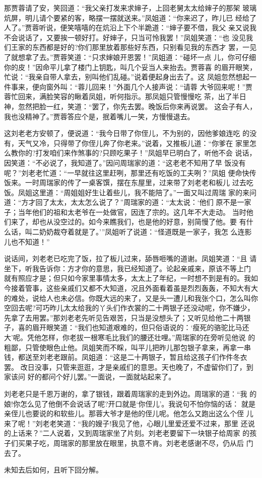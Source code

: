 那贾蓉请了安，笑回道：“我父亲打发来求婶子，上回老舅太太给婶子的那架
玻璃炕屏，明儿请个要紧的客，略摆一摆就送来。”凤姐道：“你来迟了，昨儿已
经给了人了。”贾蓉听说，便笑嘻嘻的在炕沿上下个半跪道：“婶子要不借，我父
亲又说我不会说话了，又要挨一顿好打。好婶子，只当可怜我罢！”凤姐笑道：“也
没见我们王家的东西都是好的?你们那里放着那些好东西，只别看见我的东西才
罢，一见了就想拿了去。”贾蓉笑道：“只求婶娘开恩罢！”凤姐道：“碰坏一点
儿，你可仔细你的皮！”因命平儿拿了楼门上钥匙，叫几个妥当人来抬去。贾蓉喜
的眉开眼笑，忙说：“我亲自带人拿去，别叫他们乱碰。”说着便起身出去了。这
凤姐忽然想起一件事来，便向窗外叫：“蓉儿回来！”外面几个人接声说：“请蓉
大爷回来呢！”贾蓉忙回来，满脸笑容的瞅着凤姐，听何指示。那凤姐只管慢慢吃
茶，出了半日神，忽然把脸一红，笑道：“罢了，你先去罢。晚饭后你来再说罢。
这会子有人，我也没精神了。”贾蓉答应个是，抿着嘴儿一笑，方慢慢退去。

这刘老老方安顿了，便说道：“我今日带了你侄儿，不为别的，因他爹娘连吃
的没有，天气又冷，只得带了你侄儿奔了你老来。”说着，又推板儿道：“你爹在
家里怎么教你的?打发咱们来作煞事的?只顾吃果子！”凤姐早已明白了，听他不会
说话，因笑道：“不必说了，我知道了。”因问周瑞家的道：“这老老不知用了早
饭没有呢？”刘老老忙道：“一早就往这里赶咧，那里还有吃饭的工夫咧？”凤姐
便命快传饭来。一时周瑞家的传了一桌客馔，摆在东屋里，过来带了刘老老和板儿
过去吃饭。凤姐这里道：“周姐姐好生让着些儿，我不能陪了。”一面又叫过周瑞
家的来问道：“方才回了太太，太太怎么说了？”周瑞家的道：“太太说：‘他们
原不是一家子；当年他们的祖和太老爷在一处做官，因连了宗的。这几年不大走动。
当时他们来了，却也从没空过的。如今来瞧我们，也是他的好意，别简慢了他。要
有什么话，叫二奶奶裁夺着就是了。’”凤姐听了说道：“怪道既是一家子，我怎
么连影儿也不知道！”

说话间，刘老老已吃完了饭，拉了板儿过来，舔唇咂嘴的道谢。凤姐笑道：“且
请坐下，听我告诉你：方才你的意思，我已经知道了。论起亲戚来，原该不等上门
就有照应才是；但只如今家里事情太多，太太上了年纪，一时想不到是有的。我如
今接着管事，这些亲戚们又都不大知道，况且外面看着虽是烈烈轰轰，不知大有大
的难处，说给人也未必信。你既大远的来了，又是头一遭儿和我张个口，怎么叫你
空回去呢?可巧昨儿太太给我的丫头们作衣裳的二十两银子还没动呢，你不嫌少，
先拿了去用罢。”那刘老老先听见告艰苦，只当是没想头了；又听见给他二十两银
子，喜的眉开眼笑道：“我们也知道艰难的，但只俗语说的：‘瘦死的骆驼比马还
大’呢。凭他怎样，你老拔一根寒毛比我们的腰还壮哩。”周瑞家的在旁听见他说
的粗鄙，只管使眼色止他。凤姐笑而不睬，叫平儿把昨儿那包银子拿来，再拿一串
钱，都送至刘老老跟前。凤姐道：“这是二十两银子，暂且给这孩子们作件冬衣罢。
改日没事，只管来逛逛，才是亲戚们的意思。天也晚了，不虚留你们了，到家该问
好的都问个好儿罢。”一面说，一面就站起来了。

刘老老只是千恩万谢的，拿了银钱，跟着周瑞家的走到外边。周瑞家的道：“我
的娘!你怎么见了他倒不会说话了呢?开口就是‘你侄儿’。我说句不怕你恼的话：
就是亲侄儿也要说的和软些儿。那蓉大爷才是他的侄儿呢。他怎么又跑出这么个侄
儿来了呢！”刘老老笑道：“我的嫂子!我见了他，心眼儿里爱还爱不过来，那里
还说的上话来？”二人说着，又到周瑞家坐了片刻。刘老老要留下一块银子给周家
的孩子们买果子吃，周瑞家的那里放在眼里，执意不肯。刘老老感谢不尽，仍从后
门去了。

未知去后如何，且听下回分解。